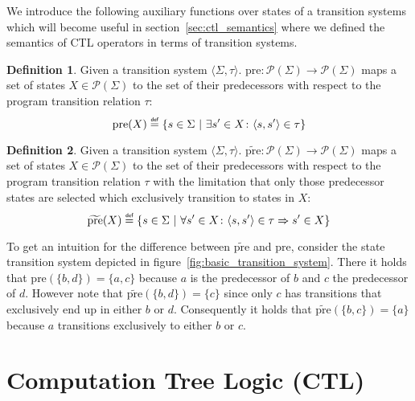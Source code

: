 \documentclass[11pt,a4paper,titlepage]{article}
\theoremstyle{definition}
\newtheorem{definition}{Definition}[section]
\newcommand\eqdef{\mathrel{\overset{\makebox[0pt]{\mbox{\normalfont\tiny\sffamily def}}}{=}}}
\begin{document}
We introduce the following auxiliary functions over states of a transition systems which will become 
useful in section~\ref{sec:ctl_semantics} where we defined the semantics of CTL operators in terms of transition systems.

\begin{definition}\label{def:pre}
    Given a transition system $\langle \Sigma, \tau \rangle$. $\text{pre} \colon \mathcal{P}(\Sigma) \to \mathcal{P}(\Sigma)$
    maps a set of states $X \in \mathcal{P}(\Sigma)$ to the set of their predecessors with respect to the program transition
    relation $\tau$:
\begin{equation}
    \text{pre}(X) \eqdef \{s \in \Sigma \ | \ \exists s' \in X \colon \langle s, s' \rangle \in \tau \}  
\end{equation}
\end{definition}


\begin{definition}\label{def:tilde_pre}
    Given a transition system $\langle \Sigma, \tau \rangle$. $\widetilde{\text{pre}} \colon \mathcal{P}(\Sigma) \to \mathcal{P}(\Sigma)$
    maps a set of states $X \in \mathcal{P}(\Sigma)$ to the set of their predecessors with respect to the program transition
    relation $\tau$ with the limitation that only those predecessor states are selected which exclusively transition to states in $X$:
\begin{equation}
    \widetilde{\text{pre}}(X) \eqdef \{s \in \Sigma \ | \ \forall s' \in X \colon \langle s, s' \rangle \in \tau \Rightarrow s' \in X \}  
\end{equation}
\end{definition}

To get an intuition for the difference between $\widetilde{\text{pre}}$ and $\text{pre}$, consider the state transition system 
depicted in figure~\ref{fig:basic_transition_system}. There it holds that $\text{pre}(\{b, d\}) = \{a, c\}$ 
because $a$ is the predecessor of $b$ and $c$ the predecessor of $d$. 
However note that $\widetilde{\text{pre}}(\{b, d\}) = \{c\}$ since only $c$ has 
transitions that exclusively end up in either $b$ or $d$. 
Consequently it holds that $\widetilde{\text{pre}}(\{b, c\}) = \{a\}$ because $a$ transitions exclusively to either $b$ or $c$.


\section{Computation Tree Logic (CTL)}\label{sec:computation_tree_logic}
\end{document}
